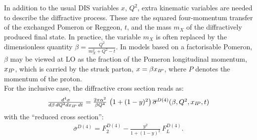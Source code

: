 %

In addition to the usual DIS variables $x$, $Q^2$, extra kinematic variables are needed to describe the diffractive process. 
These are the squared four-momentum transfer of the exchanged Pomeron or Reggeon, $t$, and 
the mass $m_X$ of the diffractively produced final state. 
In practice, the variable $m_X$ 
is often replaced by the dimensionless quantity $\beta=\frac{Q^2}{m_X^2+Q^2-t}$.
In models based on a factorisable Pomeron, $\beta$ may be viewed at LO as the fraction of the
Pomeron longitudinal momentum, $x_{{I\!P}}$, which is carried by the struck parton, $x=\beta x_{{I\!P}}$,
where $P$ denotes the momentum of the proton.
\\
For the inclusive case, the diffractive cross section reads as:
\begin{equation}
\begin{array}{lcl}
    \frac{d^4\sigma}{d\beta\,dQ^2dx_{{I\!P}}\,dt}
=
  \frac{2\pi\alpha^2}{\beta Q^4}\,
    \left( 1 +  (1-y)^2 \right) \overline\sigma^{D(4)}(\beta,Q^2,x_{{I\!P}},t)
\label{Dxs}
\end{array}
\end{equation}
with the ``reduced cross section'': 
\begin{equation}
\begin{array}{lcl}
\overline\sigma^{D(4)}
 = F_2^{D(4)} - \frac{y^2}{1 +  (1-y)^2}\, F_L^{D(4)}.
\label{eq:sigred}
\end{array}
\end{equation}

